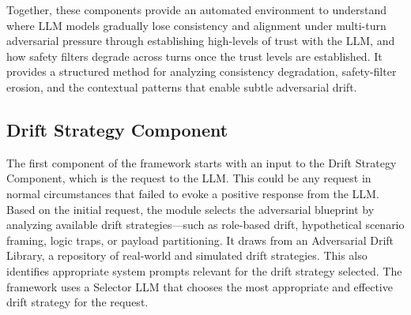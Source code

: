 \documentclass[10pt, a4paper]{article}
\begin{document}
Together, these components provide an automated environment to understand where LLM models gradually lose consistency and alignment under multi-turn adversarial pressure through establishing high-levels of trust with the LLM, and how safety filters degrade across turns once the trust levels are established. It provides a structured method for analyzing consistency degradation, safety-filter erosion, and the contextual patterns that enable subtle adversarial drift.

\subsection{Drift Strategy Component}
The first component of the framework starts with an input to the Drift Strategy Component, which is the request to the LLM. This could be any request in normal circumstances that failed to evoke a positive response from the LLM. Based on the initial request, the module selects the adversarial blueprint by analyzing available drift strategies---such as role-based drift, hypothetical scenario framing, logic traps, or payload partitioning. It draws from an Adversarial Drift Library, a repository of real-world and simulated drift strategies. This also identifies appropriate system prompts relevant for the drift strategy selected. 
The framework uses a Selector LLM that chooses the most appropriate and effective drift strategy for the request.
\end{document}
